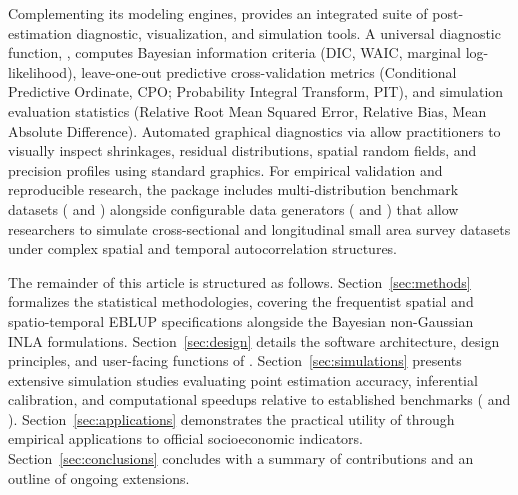 Complementing its modeling engines,  provides an integrated suite of post-estimation diagnostic, visualization, and simulation tools. A universal diagnostic function, , computes Bayesian information criteria (DIC, WAIC, marginal log-likelihood), leave-one-out predictive cross-validation metrics (Conditional Predictive Ordinate, CPO; Probability Integral Transform, PIT), and simulation evaluation statistics (Relative Root Mean Squared Error, Relative Bias, Mean Absolute Difference). Automated graphical diagnostics via  allow practitioners to visually inspect shrinkages, residual distributions, spatial random fields, and precision profiles using standard  graphics. For empirical validation and reproducible research, the package includes multi-distribution benchmark datasets ( and ) alongside configurable data generators ( and ) that allow researchers to simulate cross-sectional and longitudinal small area survey datasets under complex spatial and temporal autocorrelation structures.

The remainder of this article is structured as follows. Section~\ref{sec:methods} formalizes the statistical methodologies, covering the frequentist spatial and spatio-temporal EBLUP specifications alongside the Bayesian non-Gaussian INLA formulations. Section~\ref{sec:design} details the software architecture, design principles, and user-facing functions of . Section~\ref{sec:simulations} presents extensive simulation studies evaluating point estimation accuracy, inferential calibration, and computational speedups relative to established benchmarks ( and ). Section~\ref{sec:applications} demonstrates the practical utility of  through empirical applications to official socioeconomic indicators. Section~\ref{sec:conclusions} concludes with a summary of contributions and an outline of ongoing extensions.

